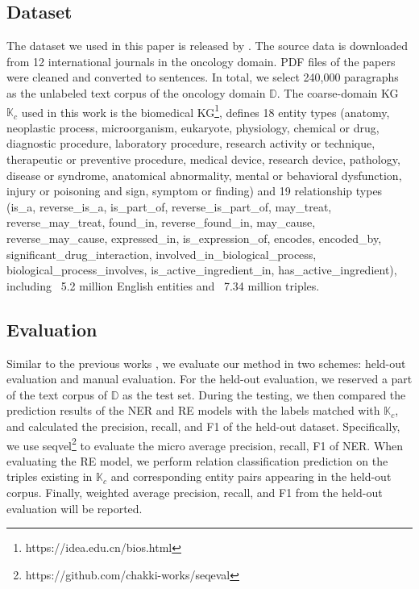 \documentclass[sigconf]{acmart}
\begin{document}
\subsection{Dataset}

The dataset we used in this paper is released by \cite{rezayi2022clinicalradiobert}. The source data is 
 downloaded  from 12 international journals in the oncology domain. PDF files of the papers were cleaned and converted to sentences. In total, we select 240,000 paragraphs as the unlabeled text corpus of the oncology domain $\mathbb{D}$. The coarse-domain KG $\mathbb{K}_c$ used in this work is the biomedical KG\footnote{https://idea.edu.cn/bios.html}, defines 18 entity types (anatomy, neoplastic process, microorganism, eukaryote, physiology, chemical or drug, diagnostic procedure, laboratory procedure, research activity or technique, therapeutic or preventive procedure, medical device, research device, pathology, disease or syndrome, anatomical abnormality, mental or behavioral dysfunction, injury or poisoning and sign, symptom or finding) and 19 relationship types (is\_a, reverse\_is\_a, is\_part\_of, reverse\_is\_part\_of, may\_treat, reverse\_may\_treat, found\_in, reverse\_found\_in, may\_cause, reverse\_may\_cause, expressed\_in, is\_expression\_of, encodes, encoded\_by, significant\_drug\_interaction, involved\_in\_biological\_process, biological\_process\_involves, is\_active\_ingredient\_in, has\_active\_ingredient), including ~5.2 million English entities and ~7.34 million triples. 

\subsection{Evaluation}

Similar to the previous works \cite{mintz2009distant}, we evaluate our method in two schemes: held-out evaluation and manual evaluation. For the held-out evaluation, we reserved a part of the text corpus of $\mathbb{D}$ as the test set. During the testing, we then compared the prediction results of the NER and RE models with the labels matched with $\mathbb{K}_c$, and calculated the precision, recall, and F1 of the held-out dataset. Specifically, we use seqvel\footnote{https://github.com/chakki-works/seqeval} to evaluate the micro average precision, recall, F1 of NER. When evaluating the RE model, we perform relation classification prediction on the triples existing in $\mathbb{K}_c$ and corresponding entity pairs appearing in the held-out corpus. Finally, weighted average precision, recall, and F1 from the held-out evaluation will be reported.
\end{document}
